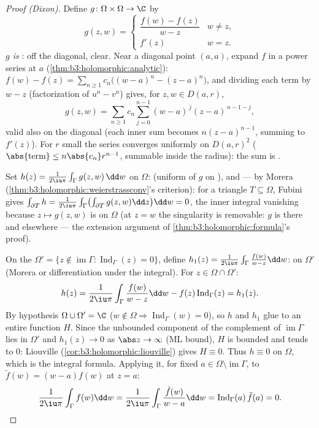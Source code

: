 \begin{proof}[Proof (Dixon)]
Define $g \colon \Omega\times\Omega \to \C$ by
\[
g(z, w) = \begin{cases}
\dfrac{f(w) - f(z)}{w - z} & w \neq z,\\[4pt]
f'(z) & w = z .
\end{cases}
\]
\emph{$g$ is }: off the diagonal, clear. Near a
diagonal point $(a, a)$, expand $f$ in a power series at $a$
(\cref{thm:b3:holomorphic:analytic}): $f(w) - f(z) =
\sum_{n\geq1}c_n\bigl((w-a)^n - (z-a)^n\bigr)$, and dividing
each term by $w - z$ (factorization of $u^n - v^n$) gives, for
$z, w \in D(a, r)$,
\[
g(z, w) =
\sum_{n\geq1}c_n\sum_{j=0}^{n-1}(w-a)^{\,j}(z-a)^{\,n-1-j},
\]
valid also on the diagonal (each inner sum becomes
$n(z-a)^{n-1}$, summing to $f'(z)$). For $r$ small the series
converges uniformly on $D(a,r)^2$
($\abs{\text{term}} \leq n\abs{c_n}r^{n-1}$, summable inside
the radius): the sum is .

Set $h(z) = \frac1{2\iu\pi}\int_\Gamma g(z, w)\,\dd w$ on
$\Omega$:  (uniform  of $g$ on ),
and  --- by Morera
(\cref{thm:b3:holomorphic:weierstrassconv}'s criterion): for a
triangle $T \subseteq \Omega$, Fubini gives $\int_{\partial
T}h = \frac1{2\iu\pi}\int_\Gamma\bigl(\int_{\partial T}g(z,
w)\dd z\bigr)\dd w = 0$, the inner integral vanishing because
$z \mapsto g(z, w)$ is  on $\Omega$ (at $z = w$ the
singularity is removable: $g$ is  there and
 elsewhere --- the extension argument of
\cref{thm:b3:holomorphic:formula}'s proof).

On the  $\Omega' = \{z \notin \operatorname{im}\Gamma
: \operatorname{Ind}_\Gamma(z) = 0\}$, define $h_1(z) =
\frac1{2\iu\pi}\int_\Gamma\frac{f(w)}{w - z}\dd w$:
 on $\Omega'$ (Morera or differentiation under the
integral). For $z \in \Omega\cap\Omega'$:
\[
h(z) = \frac1{2\iu\pi}\int_\Gamma\frac{f(w)}{w-z}\dd w
- f(z)\operatorname{Ind}_\Gamma(z) = h_1(z) .
\]
By hypothesis $\Omega\cup\Omega' = \C$ ($w \notin \Omega
\Rightarrow \operatorname{Ind}_\Gamma(w) = 0$), so $h$ and
$h_1$ glue to an entire function $H$. Since the unbounded
component of the complement of $\operatorname{im}\Gamma$ lies
in $\Omega'$ and $h_1(z) \to 0$ as $\abs z \to \infty$ (ML
bound), $H$ is bounded and tends to $0$: Liouville
(\cref{cor:b3:holomorphic:liouville}) gives $H \equiv 0$. Thus
$h \equiv 0$ on $\Omega$, which is the integral formula.
Applying it, for fixed $a \in
\Omega\setminus\operatorname{im}\Gamma$, to $\tilde f(w) =
(w - a)f(w)$ at $z = a$:
\[
\frac1{2\iu\pi}\int_\Gamma f(w)\dd w =
\frac1{2\iu\pi}\int_\Gamma \frac{\tilde f(w)}{w - a}\dd w =
\operatorname{Ind}_\Gamma(a)\,\tilde f(a) = 0 .
\]
\end{proof}

